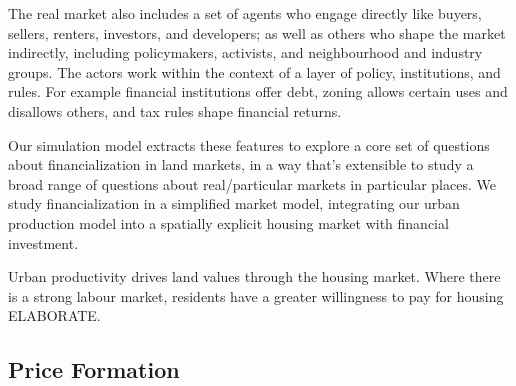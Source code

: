 The real market also includes a set of agents who engage directly like buyers, sellers, renters, investors, and developers; as well as others who shape the market indirectly, including policymakers, activists, and neighbourhood and industry groups. %
The actors work within the context of a layer of policy, institutions, and rules. For example financial institutions offer debt,
zoning allows certain uses and disallows others, and tax rules shape financial returns.

Our simulation model extracts %
these features to explore a core set of questions about financialization in land markets, in a way that's extensible to study a broad range of questions about real/particular markets in particular places.
We study \gls{financialization} in a simplified market model, integrating
our urban production model  into a spatially explicit {housing market} with financial investment. %

Urban productivity %
drives land values through the housing market. Where there is a strong labour market, residents have a greater willingness to pay for housing \cite{productivity_price_link} ELABORATE. 



\subsection{Price Formation} \label{sec-price-formation}

